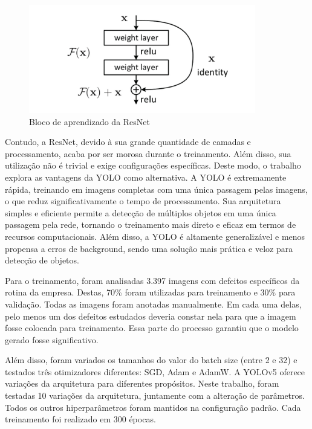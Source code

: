 \begin{figure}[!h]
    \center
    \begin{minipage}{1\linewidth}
        \center
        \captionsetup{justification=centering,margin=0.5cm,font=small}
        \includegraphics[width=0.7\linewidth]{img/cap3/salto.png}
        \caption{Bloco de aprendizado da ResNet \cite{he2016deep}}
        \label{fig:salto}
    \end{minipage}
\end{figure}

Contudo, a ResNet, devido à sua grande quantidade de camadas e processamento, acaba por ser morosa durante o treinamento. Além disso, sua utilização não é trivial e exige configurações específicas. Deste modo, o trabalho explora as vantagens da YOLO como alternativa. A YOLO é extremamente rápida, treinando em imagens completas com uma única passagem pelas imagens, o que reduz significativamente o tempo de processamento. Sua arquitetura simples e eficiente permite a detecção de múltiplos objetos em uma única passagem pela rede, tornando o treinamento mais direto e eficaz em termos de recursos computacionais. Além disso, a YOLO é altamente generalizável e menos propensa a erros de background, sendo uma solução mais prática e veloz para detecção de objetos.	

Para o treinamento, foram analisadas 3.397 imagens com defeitos específicos da rotina da empresa. Destas, 70\% foram utilizadas para treinamento e 30\% para validação. Todas as imagens foram anotadas manualmente. Em cada uma delas, pelo menos um dos defeitos estudados deveria constar nela para que a imagem fosse colocada para treinamento. Essa parte do processo garantiu que o modelo gerado fosse significativo.

Além disso, foram variados os tamanhos do valor do batch size (entre 2 e 32) e testados três otimizadores diferentes: SGD, Adam e AdamW. A YOLOv5 oferece variações da arquitetura para diferentes propósitos. Neste trabalho, foram testadas 10 variações da arquitetura, juntamente com a alteração de parâmetros. Todos os outros hiperparâmetros foram mantidos na configuração padrão. Cada treinamento foi realizado em 300 épocas.

